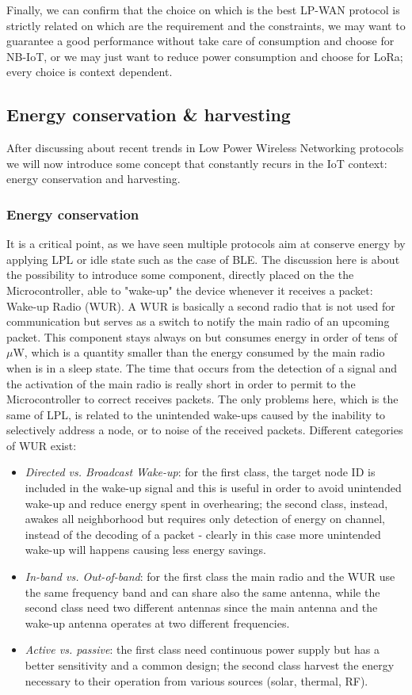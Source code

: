 \documentclass[sigconf]{acmart}
\begin{document}
      Finally, we can confirm that the choice on which is the best LP-WAN protocol is strictly related on which are the requirement and the constraints, we may want to guarantee a good performance without take care of consumption and choose for NB-IoT, or we may just want to reduce power consumption and choose for LoRa; every choice is context dependent.
      
    \subsection{Energy conservation \& harvesting}
    After discussing about recent trends in Low Power Wireless Networking protocols we will now introduce some concept that constantly recurs in the IoT context: energy conservation and harvesting. 
    \subsubsection{Energy conservation} 
    It is a critical point, as we have seen multiple protocols aim at conserve energy by applying LPL or idle state such as the case of BLE. The discussion here is about the possibility to introduce some component, directly placed on the the Microcontroller, able to "wake-up" the device whenever it receives a packet: Wake-up Radio (WUR). A WUR is basically a second radio that is not used for communication but serves as a switch to notify the main radio of an upcoming packet. This component stays always on but consumes energy in order of tens of \(\mu\)W, which is a quantity smaller than the energy consumed by the main radio when is in a sleep state. The time that occurs from the detection of a signal and the activation of the main radio is really short in order to permit to the Microcontroller to correct receives packets. The only problems here, which is the same of LPL, is related to the unintended wake-ups caused by the inability to selectively address a node, or to noise of the received packets. Different categories of WUR exist:
    \begin{itemize}
    \item \textit{Directed vs. Broadcast Wake-up}: for the first class, the target node ID is included in the wake-up signal and this is useful in order to avoid unintended wake-up and reduce energy spent in overhearing; the second class, instead, awakes all neighborhood but requires only detection of energy on channel, instead of the decoding of a packet - clearly in this case more unintended wake-up will happens causing less energy savings.
    \item \textit{In-band vs. Out-of-band}: for the first class the main radio and the WUR use the same frequency band and can share also the same antenna, while the second class need two different antennas since the main antenna and the wake-up antenna operates at two different frequencies.
    \item \textit{Active vs. passive}: the first class need continuous power supply but has a better sensitivity and a common design; the second class harvest the energy necessary to their operation from various sources (solar, thermal, RF).
    \end{itemize}
\end{document}
